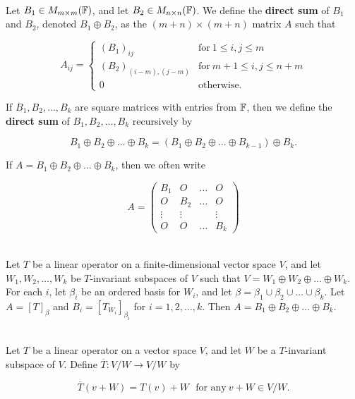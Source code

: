 \begin{definition}
	\hfill\\
	Let $B_1 \in M_{m \times m}(\mathbb{F})$, and let $B_2 \in M_{n \times n}(\mathbb{F})$. We define the \textbf{direct sum} of $B_1$ and $B_2$, denoted $B_1 \oplus B_2$, as the $(m + n) \times (m + n)$ matrix $A$ such that

	\[A_{ij} = \begin{cases}
			(B_1)_{ij}          & \text{for}\ 1 \leq i, j \leq m         \\
			(B_2)_{(i-m),(j-m)} & \text{for}\ m + 1 \leq i, j \leq n + m \\
			0                   & \text{otherwise.}
		\end{cases}\]

	If $B_1, B_2, \dots, B_k$ are square matrices with entries from $\mathbb{F}$, then we define the \textbf{direct sum} of $B_1, B_2, \dots, B_k$ recursively by

	\[B_1 \oplus B_2 \oplus \dots \oplus B_k = (B_1 \oplus B_2 \oplus \dots \oplus B_{k-1})\oplus B_k.\]

	If $A= B_1 \oplus B_2 \oplus \dots \oplus B_k$, then we often write

	\[A = \begin{pmatrix}
			B_1    & O      & \dots & O      \\
			O      & B_2    & \dots & O      \\
			\vdots & \vdots &       & \vdots \\
			O      & O      & \dots & B_k
		\end{pmatrix}\]
\end{definition}

\begin{theorem}
	\hfill\\
	Let $T$ be a linear operator on a finite-dimensional vector space $V$, and let $W_1, W_2, \dots, W_k$ be $T$-invariant subspaces of $V$ such that $V = W_1 \oplus W_2 \oplus \dots \oplus W_k$. For each $i$, let $\beta_i$ be an ordered basis for $W_i$, and let $\beta = \beta_1 \cup \beta_2 \cup \dots \cup \beta_k$. Let $A = [T]_\beta$ and $B_i = [T_{W_i}]_{\beta_i}$ for $i = 1, 2, \dots, k$. Then $A = B_1 \oplus B_2 \oplus \dots \oplus B_k$.
\end{theorem}

\begin{definition}
	\hfill\\
	Let $T$ be a linear operator on a vector space $V$, and let $W$ be a $T$-invariant subspace of $V$. Define $\overline{T}: V/W \to V/W$ by

	\[\overline{T}(v + W) = T(v) + W\ \ \ \text{for any}\ v + W \in V/W.\]
\end{definition}

